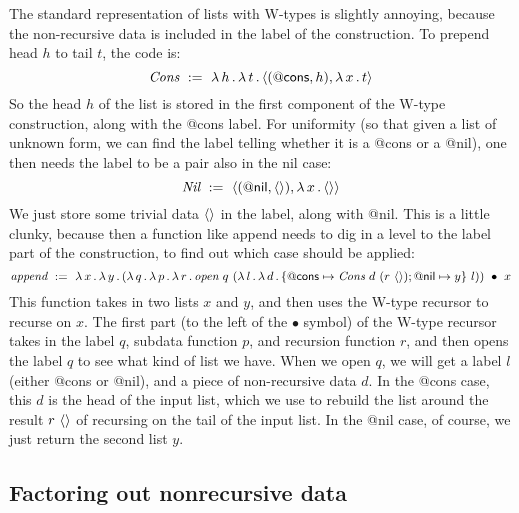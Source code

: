 \documentclass{article}
\begin{document}
The standard representation of lists with W-types is slightly annoying, because
the non-recursive data is included in the label of the construction.
To prepend head $h$ to tail $t$, the code is:
\[
\textit{Cons}\ :=\ \lam{h}{\lam{t}{\ctor{(\mathsf{@cons},h)}{\lam{x}{t}}}}
\]
\noindent So the head $h$ of the list is stored in the first component
of the W-type construction, along with the \textsf{@cons} label.  For
uniformity (so that given a list of unknown form, we can find the
label telling whether it is a \textsf{@cons} or a \textsf{@nil}), one
then needs the label to be a pair also in the nil case:
\[
\textit{Nil}\ :=\ \ctor{(\mathsf{@nil},\wunit)}{\lam{x}{\wunit}}
\]
\noindent We just store some trivial data $\langle\rangle$ in the label, along with \textsf{@nil}.
This is a little clunky, because then a function like append needs to dig in a level to the label part of the construction,
to find out which case should be applied:
\[
\textit{append}\ :=\ \lam{x}{\lam{y}{\wrec{(\lam{q}{\lam{p}{\lam{r}{\textit{open}\ q\ (\lam{l}{\lam{d}{\{ \mathsf{@cons}\mapsto \textit{Cons}\ d\ (r\ \wunit); \mathsf{@nil}\mapsto y\}\ l}})}}})}{x}}}
\]
\noindent This function takes in two lists $x$ and $y$, and then uses the W-type recursor to recurse on $x$.  The first part (to the left of the $\bullet$ symbol) of the W-type recursor takes in the label $q$, subdata function $p$, and recursion function $r$, and then opens the label $q$ to see what kind of list we have.  When we open $q$, we will get a label $l$ (either \textsf{@cons} or \textsf{@nil}), and a piece of non-recursive data $d$.  In the \textsf{@cons} case, this $d$ is the head of the input list, which we use to rebuild the list around the result $r\ \langle\rangle$ of recursing on the tail of the input list.  In the \textsf{@nil} case, of course, we just return the second list $y$.

\subsection{Factoring out nonrecursive data}
\end{document}
